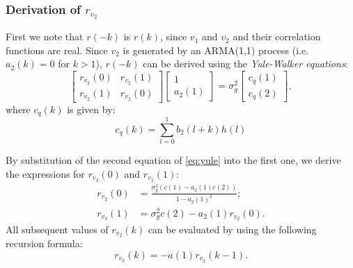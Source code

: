 \documentclass[12pt,a4paper]{article}
\begin{document}
\subsubsection*{Derivation of $r_{v_2}$}
First we note that $r(-k)$ is $r(k)$, since $v_1$ and $v_2$ and their correlation functions are real. Since $v_2$ is generated by an ARMA(1,1) process (i.e. $a_2(k)=0$ for $k>1$), $r(-k)$ can be derived using the \emph{Yule-Walker equations}:	
\begin{equation}\label{eq:yule}
\begin{bmatrix}
  r_{v_2}(0) & r_{v_2}(1)\\
  r_{v_2}(1) & r_{v_2}(0)
\end{bmatrix}
\begin{bmatrix}
  1\\
  a_2(1)
\end{bmatrix}
=
\sigma_g^2
\begin{bmatrix}
  c_q(1)\\
  c_q(2)
\end{bmatrix},
\end{equation}
where $c_q(k)$ is given by:
\begin{equation}\label{eq:c}
c_q(k) = \sum\limits_{l=0}^{1}b_2(l+k)h(l)
\end{equation}

By substitution of the second equation of \autoref{eq:yule} into the first one, we derive the expressions for $r_{v_2}(0)$ and $r_{v_2}(1)$:
\begin{align}\label{eq:rv2}
r_{v_2}(0) &= \frac{\sigma^2_{g}(c(1) - a_2(1)c(2))}{1-a_2(1)^2};\\
r_{v_2}(1) &= \sigma^2_{g}c(2) - a_2(1)r_{v_2}(0).
\end{align}
All subsequent values of $r_{v_2}(k)$ can be evaluated by using the following recursion formula:
\begin{equation}\label{eq:recursion}
r_{v_2}(k) = -a(1)r_{v_2}(k-1).
\end{equation}
\end{document}
